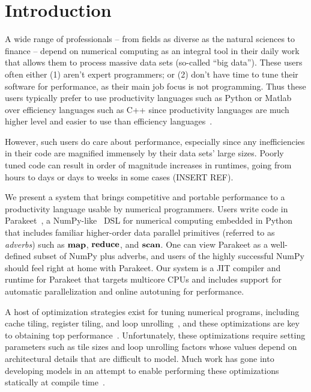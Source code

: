 \documentclass[preprint,9pt]{sigplanconf}
\begin{document}
\section{Introduction}
\label{intro}
A wide range of professionals -- from fields as diverse as the natural sciences to finance -- depend on numerical computing as an integral tool in their daily work that allows them to process massive data sets (so-called ``big data'').  These users often either (1) aren't expert programmers; or (2) don't have time to tune their software for performance, as their main job focus is not programming.  Thus these users typically prefer to use productivity languages such as Python or Matlab over efficiency languages such as C++ since productivity languages are much higher level and easier to use than efficiency languages~\cite{Pre03}.

However, such users do care about performance, especially since any inefficiencies in their code are magnified immensely by their data sets' large sizes.  Poorly tuned code can result in order of magnitude increases in runtimes, going from hours to days or days to weeks in some cases (INSERT REF).

We present a system that brings competitive and portable performance to a productivity language usable by numerical programmers.  Users write code in Parakeet~\cite{Rubi12}, a NumPy-like~\cite{Dubo96} DSL for numerical computing embedded in Python that includes familiar higher-order data parallel primitives (referred to as \emph{adverbs}) such as $\mbox{\textbf{map}}$, $\mbox{\textbf{reduce}}$, and $\mbox{\textbf{scan}}$.  One can view Parakeet as a well-defined subset of NumPy plus adverbs, and users of the highly successful NumPy should feel right at home with Parakeet. Our system is a JIT compiler and runtime for Parakeet that targets multicore CPUs and includes support for automatic parallelization and online autotuning for performance.

A host of optimization strategies exist for tuning numerical programs, including cache tiling, register tiling, and loop unrolling~\cite{Chen05b, Cole95, Lam91, Wolf91}, and these optimizations are key to obtaining top performance~\cite{Frig05, Whal00, Yoto05}.  Unfortunately, these optimizations require setting parameters such as tile sizes and loop unrolling factors whose values depend on architectural details that are difficult to model.  Much work has gone into developing models in an attempt to enable performing these optimizations statically at compile time~\cite{Shir12, Yoto03, Yoto05}.
\end{document}
